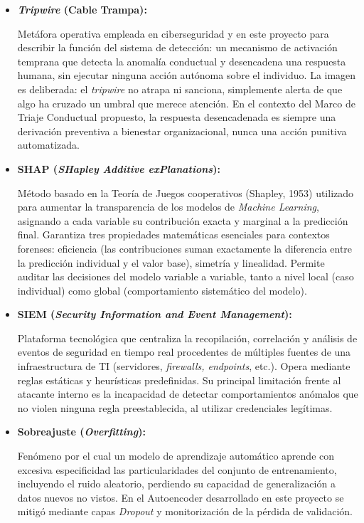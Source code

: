 \documentclass[IB]{TFUOC}%
\begin{document}
\begin{itemize}
    \item \textbf{\textit{Tripwire} (Cable Trampa):}
    
    Metáfora operativa empleada en ciberseguridad y en este proyecto para describir la función del sistema de detección: un mecanismo de activación temprana que detecta la anomalía conductual y desencadena una respuesta humana, sin ejecutar 
    ninguna acción autónoma sobre el individuo. La imagen es deliberada: el \textit{tripwire} no atrapa ni sanciona, simplemente alerta de que algo ha cruzado un umbral que 
    merece atención. En el contexto del Marco de Triaje Conductual propuesto, la respuesta desencadenada es siempre una derivación preventiva a bienestar organizacional, 
    nunca una acción punitiva automatizada.

    \item \textbf{SHAP (\textit{SHapley Additive exPlanations}):}
    
    Método basado en la Teoría de Juegos cooperativos (Shapley, 1953) utilizado para aumentar la transparencia de los modelos de \textit{Machine Learning}, asignando a cada variable su contribución exacta y marginal a la predicción final. Garantiza tres propiedades matemáticas esenciales para contextos forenses: eficiencia (las contribuciones suman exactamente la diferencia entre la predicción individual y el valor base), simetría y linealidad. Permite auditar las decisiones del modelo variable a variable, tanto a nivel local (caso individual) como global (comportamiento sistemático del modelo).

    \item \textbf{SIEM (\textit{Security Information and Event Management}):}
    
    Plataforma tecnológica que centraliza la recopilación, correlación y análisis de eventos de seguridad en tiempo real procedentes de múltiples fuentes de una infraestructura de TI (servidores, \textit{firewalls, endpoints}, etc.). Opera mediante reglas estáticas y heurísticas predefinidas. Su principal limitación frente al atacante interno es la incapacidad de detectar comportamientos anómalos que no violen ninguna regla preestablecida, al utilizar credenciales legítimas.

    \item \textbf{Sobreajuste (\textit{Overfitting}):}
    
    Fenómeno por el cual un modelo de aprendizaje automático aprende con excesiva especificidad las particularidades del conjunto de entrenamiento, incluyendo el ruido aleatorio, perdiendo su capacidad de generalización a datos nuevos no vistos. En el Autoencoder desarrollado en este proyecto se mitigó mediante capas \textit{Dropout} y monitorización de la pérdida de validación.


\end{itemize}
\end{document}
